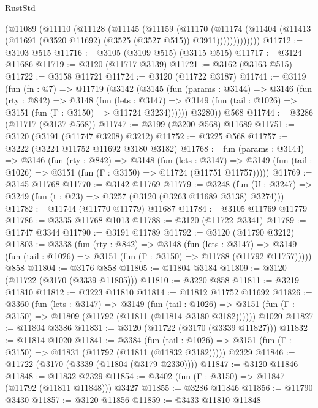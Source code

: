 \begin{lexlean}{RustStd}
\begin{coremodule}
{\begin{coremodule}
{{{{{{{{{{{{{{{{{{{{{{{{{{          (@11089
            (@11110
              (@11128
                (@11145
                  (@11159
                    (@11170
                      (@11174
                        (@11404
                          (@11413 (@11691 (@3520 @11692) (@3525 (@3527 @515)) @3911)))))))))))))
@11712 := @3103 @515
@11716 := @3105 (@3109 @515) (@3115 @515)
@11717 := @3124 @11686
@11719 := @3120 (@11717 @3139)
@11721 := @3162 (@3163 @515)
@11722 := @3158 @11721
@11724 := @3120 (@11722 @3187)
@11741 := @3119
    (fun (fn : @7) =>
    @11719
      (@3142
        (@3145
          (fun (params : @3144) =>
          @3146
            (fun (rty : @842) =>
            @3148
              (fun (lets : @3147) =>
              @3149 (fun (tail : @1026) => @3151 (fun (Γ : @3150) => @11724 @3234))))))
        @3280))
    @568
@11744 := @3286 (@11717 (@3137 @568))
@11747 := @3199 (@3200 @568) @11689
@11751 := @3120 (@3191 (@11747 @3208) @3212)
@11752 := @3225 @568
@11757 := @3222 (@3224 @11752 @11692 @3180 @3182)
@11768 := fun (params : @3144) =>
  @3146
    (fun (rty : @842) =>
    @3148
      (fun (lets : @3147) =>
      @3149 (fun (tail : @1026) => @3151 (fun (Γ : @3150) => @11724 (@11751 @11757)))))
@11769 := @3145 @11768
@11770 := @3142 @11769
@11779 := @3248
    (fun (U : @3247) => @3249 (fun (t : @23) => @3257 (@3120 (@3263 @11689 @3138) @3274)))
@11782 := @11744 (@11770 @11779) @11687
@11784 := @3105 @11769 @11779
@11786 := @3335 @11768 @1013
@11788 := @3120 (@11722 @3341)
@11789 := @11747 @3344
@11790 := @3191 @11789
@11792 := @3120 (@11790 @3212)
@11803 := @3338
    (fun (rty : @842) =>
    @3148
      (fun (lets : @3147) =>
      @3149 (fun (tail : @1026) => @3151 (fun (Γ : @3150) => @11788 (@11792 @11757)))))
    @858
@11804 := @3176 @858
@11805 := @11804 @3184
@11809 := @3120 (@11722 (@3170 (@3339 @11805)))
@11810 := @3220 @858
@11811 := @3219 @11810
@11812 := @3223 @11810
@11814 := @11812 @11752 @11692
@11826 := @3360
    (fun (lets : @3147) =>
    @3149
      (fun (tail : @1026) =>
      @3151 (fun (Γ : @3150) => @11809 (@11792 (@11811 (@11814 @3180 @3182))))))
    @1020
@11827 := @11804 @3386
@11831 := @3120 (@11722 (@3170 (@3339 @11827)))
@11832 := @11814 @1020
@11841 := @3384
    (fun (tail : @1026) => @3151 (fun (Γ : @3150) => @11831 (@11792 (@11811 (@11832 @3182)))))
    @2329
@11846 := @11722 (@3170 (@3339 (@11804 (@3179 @2330))))
@11847 := @3120 @11846
@11848 := @11832 @2329
@11854 := @3402 (fun (Γ : @3150) => @11847 (@11792 (@11811 @11848))) @3427
@11855 := @3286 @11846
@11856 := @11790 @3430
@11857 := @3120 @11856
@11859 := @3433 @11810 @11848
}}}}}}}}}}}}}}}}}}}}}}}}}}
\end{coremodule}}
\end{coremodule}
\end{lexlean}

